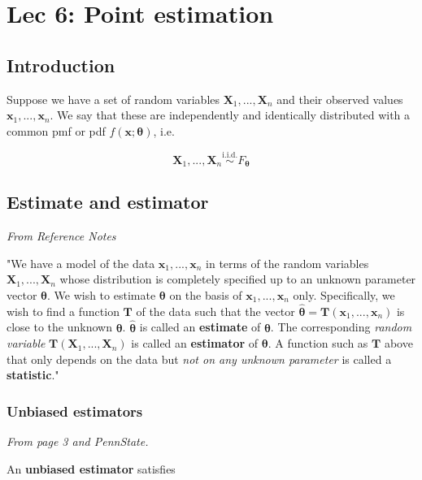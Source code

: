 \chapter[Lec 6: Point estimation]{Lec 6: Point estimation}


\section{Introduction}\label{sec:6intro}

Suppose we have a set of random variables \(\bm{X}_1, ..., \bm{X}_n\) and 
their observed values \(\bm{x}_1, ..., \bm{x}_n\). We say that these are 
independently and identically distributed with a common pmf or pdf \(f(\bm{x};\bm{\theta})\), 
i.e. 

\[\bm{X}_1, ..., \bm{X}_n \overset{\text{i.i.d.}}{\sim} F_{\bm{\theta}}\]

\section{Estimate and estimator}\label{sec:estimate and estimator}

\textit{From Reference Notes}

"We have a model of the data \(\bm{x}_1, ..., \bm{x}_n\) in terms of the random variables \(\bm{X}_1, ..., \bm{X}_n\) whose distribution is completely specified up to an unknown parameter vector \(\bm{\theta}\). 
We wish to estimate \(\bm{\theta}\) on the basis of \(\bm{x}_1, ..., \bm{x}_n\) only. 
Specifically, we wish to find a function \(\bm{T}\) of the data such that the vector \(\hat{\bm{\theta}} = \bm{T}(\bm{x}_1, ..., \bm{x}_n)\) is close to the unknown \(\bm{\theta}\). 
\(\hat{\bm{\theta}}\) is called an \textbf{estimate} of \(\bm{\theta}\). 
The corresponding \textit{random variable} \(\bm{T}(\bm{X}_1, ..., \bm{X}_n)\) is called an \textbf{estimator} of \(\bm{\theta}\). 
A function such as \(\bm{T}\) above that only depends on the data but \textit{not on any unknown parameter} is called a \textbf{statistic}."\autocite{reference}

\bigskip



\subsection{Unbiased estimators}\label{sec:unbiased ests}

\textit{From page 3 and PennState. \autocite{penn415}}

An \textbf{unbiased estimator} satisfies 

